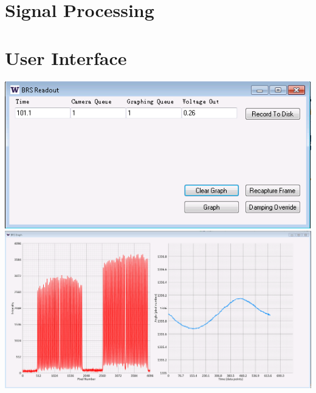\documentclass{article}
\begin{document}
\section{Signal Processing}
\section{User Interface}

\includegraphics[width=\textwidth]{BRSReadoutScreen.png}\\
\includegraphics[width=\textwidth]{BRSReadoutScreenGraph.png}


{}
\end{document}
